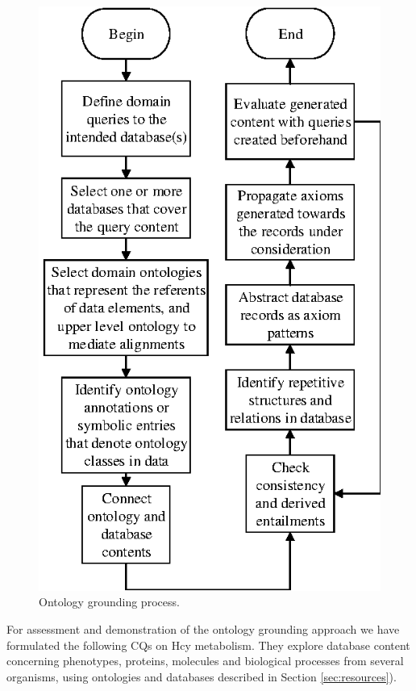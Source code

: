 \begin{figure}[h]
\centering
\includegraphics{./PIC/process}
\caption{Ontology grounding process.}
\label{fig:process}
\end{figure}

For assessment and demonstration of the ontology grounding approach we have formulated the following CQs on Hcy metabolism. They explore database content concerning phenotypes, proteins, molecules and biological processes from several organisms, using ontologies and databases described in Section \ref{sec:resources}).

